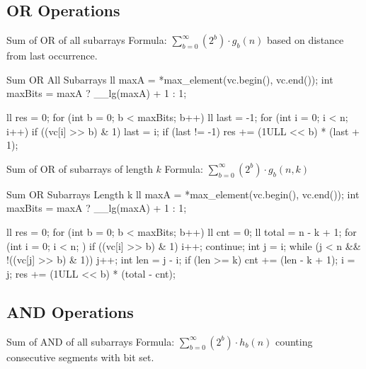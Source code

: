 \documentclass[10pt]{article}
\newcommand{\complexity}[1]{%
  \tcbox[on line,
    colback=tagbg,
    colframe=tagbg,
    boxrule=0pt,
    arc=2pt,
    boxsep=0pt,
    left=3.5pt, right=3.5pt, top=1.5pt, bottom=1.5pt
  ]{\color{tagtext}\scriptsize\bfseries\ensuremath{#1}}%
}
\begin{document}
\newpage
\subsection{OR Operations}

\begin{conceptbox}{Sum of OR of all subarrays}
    Formula: $\sum_{b = 0}^{\infty} (2^b) \cdot g_b(n)$ based on distance from last occurrence.
\end{conceptbox}

\begin{vscode}{Sum OR All Subarrays \complexity{O(N \log(\max A))}}
ll maxA = *max_element(vc.begin(), vc.end());
int maxBits = maxA ? __lg(maxA) + 1 : 1;

ll res = 0;
for (int b = 0; b < maxBits; b++) 
{
    ll last = -1;
    for (int i = 0; i < n; i++) 
    {
        if ((vc[i] >> b) & 1) 
            last = i;
        if (last != -1) 
            res += (1ULL << b) * (last + 1);
    }
}
\end{vscode}

\begin{conceptbox}{Sum of OR of subarrays of length $k$}
    Formula: $\sum_{b = 0}^{\infty} (2^b) \cdot g_b(n, k)$
\end{conceptbox}

\begin{vscode}{Sum OR Subarrays Length k \complexity{O(N \log(\max A))}}
ll maxA = *max_element(vc.begin(), vc.end());
int maxBits = maxA ? __lg(maxA) + 1 : 1;

ll res = 0;
for (int b = 0; b < maxBits; b++) 
{
    ll cnt = 0;
    ll total = n - k + 1;
    for (int i = 0; i < n; ) 
    {
        if ((vc[i] >> b) & 1) 
        { 
            i++; 
            continue; 
        }
        int j = i;
        while (j < n && !((vc[j] >> b) & 1)) 
            j++;
        int len = j - i;
        if (len >= k) 
            cnt += (len - k + 1);
        i = j;
    }
    res += (1ULL << b) * (total - cnt);
}
\end{vscode}
\newpage
\subsection{AND Operations}

\begin{conceptbox}{Sum of AND of all subarrays}
    Formula: $\sum_{b = 0}^{\infty} (2^b) \cdot h_b(n)$ counting consecutive segments with bit set.
\end{conceptbox}
\end{document}

